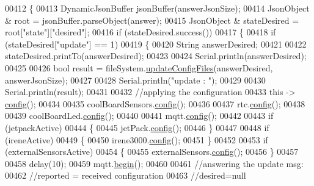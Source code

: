 \begin{DoxyCode}
00412 \{
00413     DynamicJsonBuffer jsonBuffer(answerJsonSize);
00414     JsonObject & root = jsonBuffer.parseObject(answer);
00415     JsonObject & stateDesired = root[\textcolor{stringliteral}{"state"}][\textcolor{stringliteral}{"desired"}];
00416     \textcolor{keywordflow}{if} (stateDesired.success())
00417     \{
00418         \textcolor{keywordflow}{if} (stateDesired[\textcolor{stringliteral}{"update"}] == 1)
00419         \{
00420             String answerDesired;
00421 
00422             stateDesired.printTo(answerDesired);
00423 
00424             Serial.println(answerDesired);
00425             
00426             \textcolor{keywordtype}{bool} result = fileSystem.\hyperlink{class_cool_file_system_a32dad79ae80182a83e2e8f52286b7c7b}{updateConfigFiles}(answerDesired, answerJsonSize);
00427 
00428             Serial.println(\textcolor{stringliteral}{"update : "});
00429 
00430             Serial.println(result);
00431 
00432             \textcolor{comment}{//applying the configuration    }
00433             \textcolor{keyword}{this} -> \hyperlink{class_cool_board_a583a874c09c07e70a6eb9229fc4beddb}{config}();
00434 
00435             coolBoardSensors.\hyperlink{class_cool_board_sensors_a9a218895c5423375c33c08f2c56fb23a}{config}();
00436 
00437             rtc.\hyperlink{class_cool_time_a87c28260c1bc77091162cbcf1ee2e129}{config}();
00438 
00439             coolBoardLed.\hyperlink{class_cool_board_led_a1b60e5e30bea96c49ed62ed1bf1ffc8b}{config}();
00440 
00441             mqtt.\hyperlink{class_cool_m_q_t_t_a9b703de4f1358f0ee7a5e8c44979c648}{config}();
00442 
00443             \textcolor{keywordflow}{if} (jetpackActive)
00444             \{
00445                 jetPack.\hyperlink{class_jetpack_ab065ee83e244265a2223a22f3ee4a719}{config}();
00446             \}
00447 
00448             \textcolor{keywordflow}{if} (ireneActive)
00449             \{
00450                 irene3000.\hyperlink{class_irene3000_afed5c35e4b23963c157847ef27c11e9c}{config}();
00451             \}
00452 
00453             \textcolor{keywordflow}{if} (externalSensorsActive)
00454             \{
00455                 externalSensors.\hyperlink{class_external_sensors_a862a4bd11346b37270d0244c2adabe5a}{config}();
00456             \}
00457 
00458             delay(10);
00459             mqtt.\hyperlink{class_cool_m_q_t_t_ac9248808641ebf3054ed0620ea9d0100}{begin}();
00460 
00461                 \textcolor{comment}{//answering the update msg:}
00462             \textcolor{comment}{//reported = received configuration}
00463             \textcolor{comment}{//desired=null}

\end{DoxyCode}
